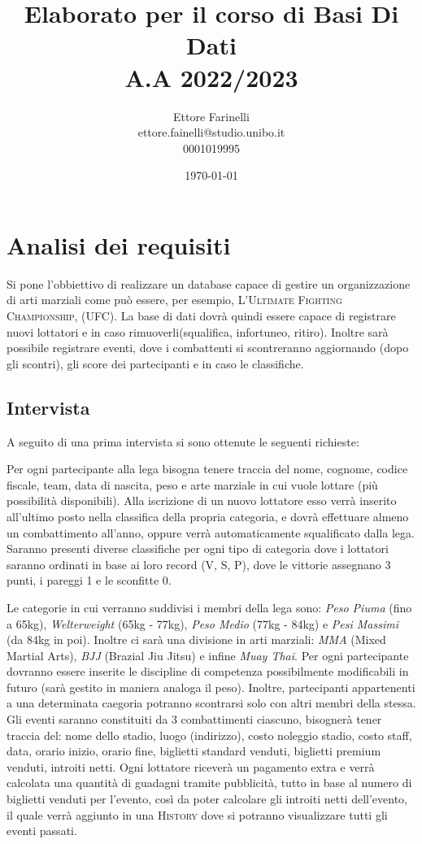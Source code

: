 \documentclass[a4paper,12pt]{report}
\title{\textbf{Elaborato per il corso di Basi Di Dati \\ A.A 2022/2023}}
\author{Ettore Farinelli \\ ettore.fainelli@studio.unibo.it \\ 0001019995}
\date{\today}
\begin{document}
\maketitle

\tableofcontents

\chapter{Analisi dei requisiti}
Si pone l'obbiettivo di realizzare un database capace di gestire un organizzazione di arti marziali come può essere, 
per esempio, \textsc{L'Ultimate Fighting Championship, (UFC)}. La base di dati dovrà quindi essere capace di registrare 
nuovi lottatori e in caso rimuoverli(squalifica, infortuneo, ritiro). Inoltre sarà possibile registrare eventi, dove 
i combattenti si scontreranno aggiornando (dopo gli scontri), gli score dei partecipanti e in caso le classifiche.

\section{Intervista}
A seguito di una prima intervista si sono ottenute le seguenti richieste:\medskip

Per ogni partecipante alla lega bisogna tenere traccia del nome, cognome, codice fiscale, team, data di nascita, peso e arte 
marziale in cui vuole lottare (più possibilità disponibili). Alla iscrizione di un nuovo lottatore esso verrà inserito all'ultimo 
posto nella classifica della propria categoria, e dovrà effettuare almeno un combattimento all'anno, oppure verrà automaticamente 
squalificato dalla lega. Saranno presenti diverse classifiche per ogni tipo di categoria dove i lottatori saranno ordinati 
in base ai loro record (V, S, P), dove le vittorie assegnano 3 punti, i pareggi 1 e le sconfitte 0.\par
Le categorie in cui verranno suddivisi i membri della lega sono: \textit{Peso Piuma} (fino a 65kg), \textit{Welterweight} 
(65kg - 77kg), \textit{Peso Medio} (77kg - 84kg) e \textit{Pesi Massimi} (da 84kg in poi). Inoltre ci sarà una divisione in 
arti marziali: \textit{MMA} (Mixed Martial Arts), \textit{BJJ} (Brazial Jiu Jitsu) e infine \textit{Muay Thai}. Per ogni 
partecipante dovranno essere inserite le discipline di competenza possibilmente modificabili in futuro (sarà gestito in maniera 
analoga il peso). Inoltre, partecipanti appartenenti a una determinata caegoria potranno scontrarsi solo con altri membri 
della stessa. Gli eventi saranno constituiti da 3 combattimenti ciascuno, bisognerà tener traccia del: nome dello stadio, 
luogo (indirizzo), costo noleggio stadio, costo staff, data, orario inizio, orario fine, biglietti standard venduti, biglietti 
premium venduti, introiti netti. Ogni lottatore riceverà un pagamento extra e verrà calcolata una quantità di guadagni tramite 
pubblicità, tutto in base al numero di biglietti venduti per l'evento, così da poter calcolare gli introiti netti dell'evento, il 
quale verrà aggiunto in una \textsc{History} dove si potranno visualizzare tutti gli eventi passati.
\end{document}
